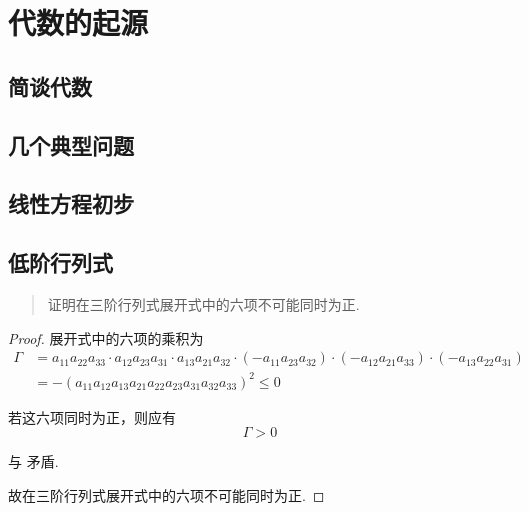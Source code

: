 \cleardoublepage

\chapter{代数的起源}

\section{简谈代数}

\section{几个典型问题}

\section{线性方程初步}

\section{低阶行列式}

\begin{quotation}
    证明在三阶行列式展开式中的六项不可能同时为正.
\end{quotation}

\begin{proof}

展开式中的六项的乘积为
\begin{equation}\label{eq:ch01:sec04:prob02}
\begin{aligned}
    \Gamma &= a_{11}a_{22}a_{33}\cdot{}a_{12}a_{23}a_{31}\cdot{a_{13}}a_{21}a_{32}
    \cdot(-a_{11}a_{23}a_{32})\cdot(-a_{12}a_{21}a_{33})\cdot(-a_{13}a_{22}a_{31}) \\
    &= -(a_{11}a_{12}a_{13}a_{21}a_{22}a_{23}a_{31}a_{32}a_{33})^2 \le 0
\end{aligned}
\end{equation}

若这六项同时为正，则应有
\begin{equation}
    \Gamma > 0
\end{equation}

与 矛盾.

故在三阶行列式展开式中的六项不可能同时为正.

\end{proof}

